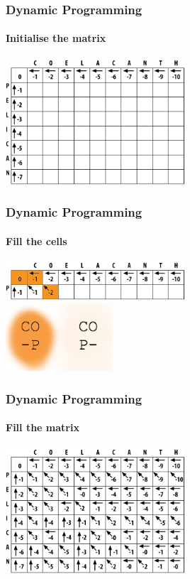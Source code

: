 \documentclass[table]{beamer}
\begin{document}
    \begin{frame}
     \frametitle{Dynamic Programming}
     \framesubtitle{Initialise the matrix}
       \begin{center}
         \includegraphics[width=0.5\textwidth]{images/initialise}
       \end{center}
    \end{frame}   
   
    \begin{frame}
     \frametitle{Dynamic Programming}
     \framesubtitle{Fill the cells}
       \begin{center}
         \includegraphics[width=0.5\textwidth]{images/fill_start} \\
         \includegraphics[width=0.3\textwidth]{images/fill_start_letters}
       \end{center}
    \end{frame}     

    \begin{frame}
     \frametitle{Dynamic Programming}
     \framesubtitle{Fill the matrix}
       \begin{center}
         \includegraphics[width=0.5\textwidth]{images/full_matrix}
       \end{center}
    \end{frame}  
   
\end{document}
